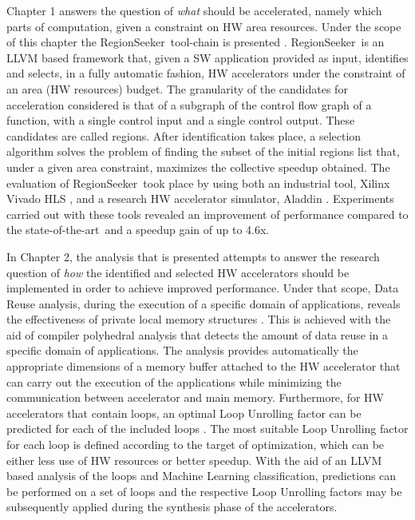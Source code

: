 \documentclass[]{usiinfthesis}
\newcommand{\rseeker}{{RegionSeeker}}
\newcommand{\SoTA}{{state-of-the-art}}
\begin{document}
Chapter 1 answers the question of {\em what} should be accelerated, namely which parts of 
computation, given a constraint on HW area resources. 
Under the scope of this chapter the \rseeker\ tool-chain is presented \cite{ZacharopoulosApr19}. 
\rseeker\ is an LLVM based framework 
that, given a SW application provided as input, identifies and selects, in a fully automatic fashion, HW 
accelerators under the constraint of an area (HW resources) budget. The granularity of the candidates for 
acceleration considered is that of a subgraph of the control flow graph of a function, with a single control 
input and a single control output. These candidates are called regions. After identification takes place, a 
selection algorithm solves the problem of 
finding the subset of the initial regions list that, under a given area constraint, maximizes the collective 
speedup obtained. The evaluation of \rseeker\ took place by using both an industrial tool, Xilinx
Vivado HLS \cite{VivadoHLSMar17}, and a research HW accelerator simulator, Aladdin \cite{ShaoJul14}. 
Experiments carried out with these tools revealed an improvement of performance compared to the \SoTA\
and a speedup gain of up to 4.6x. 
\par

In Chapter 2, the 
analysis that is presented attempts to answer the research question of {\em how} the identified and 
selected HW accelerators should be implemented in order to achieve improved performance. 
Under that scope, Data Reuse analysis, during the execution of a specific domain of applications, 
reveals the effectiveness of private local memory structures \cite{ZacharopoulosJan17}. 
This is achieved with the aid of compiler polyhedral analysis that detects the amount of data 
reuse in a specific domain of applications. The analysis provides automatically the appropriate dimensions 
of a memory buffer attached to the HW accelerator that can carry out the execution of the applications
while minimizing the communication between accelerator and main memory.
Furthermore, for HW accelerators that contain loops, an optimal
Loop Unrolling factor can be predicted for each of the included loops \cite{ZacharopoulosJul18}. 
The most suitable Loop Unrolling factor
for each loop is defined according to the target of optimization, which can be either less use of HW
 resources or better speedup. With the aid of an LLVM based analysis 
 of the loops and Machine Learning classification, predictions can be performed on a set of loops and the respective 
Loop Unrolling factors may be subsequently applied during the synthesis phase of the accelerators. \par
\end{document}
